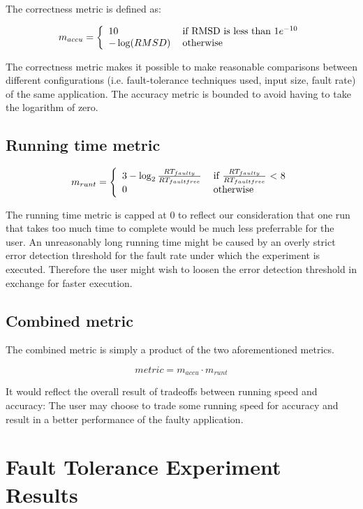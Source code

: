 \documentclass{article}
\begin{document}
The correctness metric is defined as:

\[
m_{accu} = \left \{
	\begin{array} {l l}
	10 & \: \text{if RMSD is less than $1e^{-10}$} \\
	-\log(RMSD) & \: \text{otherwise} \\
	\end{array} \right.
\]

The correctness metric makes it possible to make reasonable comparisons between
different configurations (i.e. fault-tolerance techniques used, input size, fault rate)
of the same application. The accuracy metric is bounded to avoid having to take the
logarithm of zero.

\subsection{Running time metric}

\[
m_{runt} = \left \{
	\begin{array} {l l}
	3-\log_2{\frac{RT_{faulty}}{RT_{faultfree}}} & \: \text{if $\frac{RT_{faulty}}{RT_{faultfree}}$ < 8} \\
	0 & \: \text{otherwise} \\
	\end{array} \right.
\]

The running time metric is capped at 0 to reflect our consideration that one run that takes too much time to complete would be much less preferrable for the user. An unreasonably long running time might be caused by an overly strict error detection threshold for the fault rate under which the experiment is executed. Therefore the user might wish to loosen the error detection threshold in exchange for faster execution.

\subsection{Combined metric}

The combined metric is simply a product of the two aforementioned metrics.

\[
metric = m_{accu} \cdot m_{runt}
\]

It would reflect the overall result of tradeoffs between running speed and accuracy: The user may choose to trade some running speed for accuracy and result in a better performance of the faulty application.

\section{Fault Tolerance Experiment Results}
\end{document}
